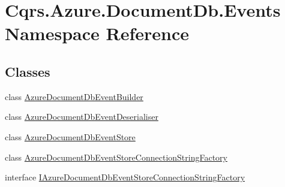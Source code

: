 \hypertarget{namespaceCqrs_1_1Azure_1_1DocumentDb_1_1Events}{}\section{Cqrs.\+Azure.\+Document\+Db.\+Events Namespace Reference}
\label{namespaceCqrs_1_1Azure_1_1DocumentDb_1_1Events}
\subsection*{Classes}
\begin{DoxyCompactItemize}
\item 
class \hyperlink{classCqrs_1_1Azure_1_1DocumentDb_1_1Events_1_1AzureDocumentDbEventBuilder}{Azure\+Document\+Db\+Event\+Builder}
\item 
class \hyperlink{classCqrs_1_1Azure_1_1DocumentDb_1_1Events_1_1AzureDocumentDbEventDeserialiser}{Azure\+Document\+Db\+Event\+Deserialiser}
\item 
class \hyperlink{classCqrs_1_1Azure_1_1DocumentDb_1_1Events_1_1AzureDocumentDbEventStore}{Azure\+Document\+Db\+Event\+Store}
\item 
class \hyperlink{classCqrs_1_1Azure_1_1DocumentDb_1_1Events_1_1AzureDocumentDbEventStoreConnectionStringFactory}{Azure\+Document\+Db\+Event\+Store\+Connection\+String\+Factory}
\item 
interface \hyperlink{interfaceCqrs_1_1Azure_1_1DocumentDb_1_1Events_1_1IAzureDocumentDbEventStoreConnectionStringFactory}{I\+Azure\+Document\+Db\+Event\+Store\+Connection\+String\+Factory}
\end{DoxyCompactItemize}
